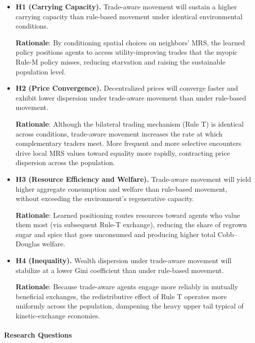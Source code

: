 \documentclass[pdflatex,sn-mathphys-num]{sn-jnl}%
\theoremstyle{thmstyleone}%
\theoremstyle{thmstyletwo}%
\theoremstyle{thmstylethree}%
\begin{document}
\begin{itemize}
\item \textbf{H1 (Carrying Capacity).} Trade-aware movement will sustain a higher carrying capacity than rule-based movement under identical environmental conditions.

\textbf{Rationale}: By conditioning spatial choices on neighbors' MRS, the learned policy positions agents to access utility-improving trades that the myopic Rule-M policy misses, reducing starvation and raising the sustainable population level.

\item \textbf{H2 (Price Convergence).} Decentralized prices will converge faster and exhibit lower dispersion under trade-aware movement than under rule-based movement.

\textbf{Rationale}: Although the bilateral trading mechanism (Rule T) is identical across conditions, trade-aware movement increases the rate at which complementary traders meet. More frequent and more selective encounters drive local MRS values toward equality more rapidly, contracting price dispersion across the population.

\item \textbf{H3 (Resource Efficiency and Welfare).} Trade-aware movement will yield higher aggregate consumption and welfare than rule-based movement, without exceeding the environment's regenerative capacity.

\textbf{Rationale}: Learned positioning routes resources toward agents who value them most (via subsequent Rule-T exchange), reducing the share of regrown sugar and spice that goes unconsumed and producing higher total Cobb--Douglas welfare.

\item \textbf{H4 (Inequality).} Wealth dispersion under trade-aware movement will stabilize at a lower Gini coefficient than under rule-based movement.

\textbf{Rationale}: Because trade-aware agents engage more reliably in mutually beneficial exchanges, the redistributive effect of Rule T operates more uniformly across the population, dampening the heavy upper tail typical of kinetic-exchange economies.

\end{itemize}

\paragraph{Research Questions}
\end{document}
